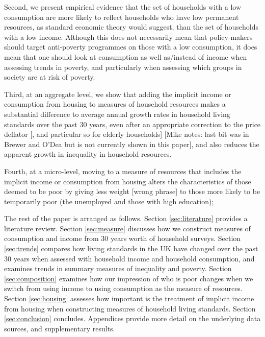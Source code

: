 Second, we present empirical evidence that the set of households with a low consumption are more likely to reflect households who have low permanent resources, as standard economic theory would suggest, than the set of households with a low income. Although this does not necessarily mean that policy-makers should target anti-poverty programmes on those with a low consumption, it does mean that one should look at consumption as well as/instead of income when assessing trends in poverty, and particularly when assessing which groups in society are at risk of poverty. 

Third, at an aggregate level, we show that adding the implicit income or consumption from housing to measures of household resources makes a substantial difference to average annual growth rates in household living standards over the past 30 years, even after an appropriate correction to the price deflator [, and particular so for elderly households] [Mike notes: last bit was in Brewer and O'Dea but is not currently shown in this paper], and also reduces the apparent growth in inequality in household resources.

Fourth, at a micro-level, moving to a measure of resources that includes the implicit income or consumption from housing alters the characteristics of those deemed to be poor by giving less weight [wrong phrase] to those more likely to be temporarily poor (the unemployed and those with high education);


The rest of the paper is arranged as follows.  Section \ref{sec:literature} provides a literature review. Section \ref{sec:measure} discusses how we construct measures of consumption and income from 30 years worth of household surveys.  Section \ref{sec:trends} compares how living standards in the UK have changed over the past 30 years when assessed with household income and household consumption, and examines trends in summary measures of inequality and poverty. Section \ref{sec:composition} examines how our impression of who is poor changes when we switch from using income to using consumption as the measure of resources. Section \ref{sec:housing} assesses how important is the treatment of implicit income from housing when constructing measures of household living standards. Section \ref{sec:conclusion} concludes. Appendices provide more detail on the underlying data sources, and supplementary results.
